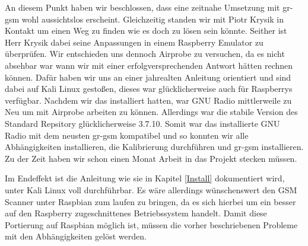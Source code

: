 An diesem Punkt haben wir beschlossen, dass eine zeitnahe Umsetzung mit gr-gsm wohl aussichtslos erscheint. Gleichzeitig standen wir mit Piotr Krysik in Kontakt um einen Weg zu finden wie es doch zu lösen sein könnte. Seither ist Herr Krysik dabei seine Anpassungen in einem Raspberry Emulator zu überprüfen. Wir entschieden uns dennoch Airprobe zu versuchen, da es nicht absehbar war wann wir mit einer erfolgversprechenden Antwort hätten rechnen können. Dafür haben wir uns an einer jahrealten Anleitung orientiert und sind dabei auf Kali Linux gestoßen, dieses war glücklicherweise auch für Raspberrys verfügbar. Nachdem wir das installiert hatten, war GNU Radio mittlerweile zu Neu um mit Airprobe arbeiten zu können. Allerdings war die stabile Version des Standard Repsitory glücklicherweise 3.7.10. Somit war das installierte GNU Radio mit dem neusten gr-gsm kompatibel und so konnten wir alle Abhängigkeiten installieren, die Kalibrierung durchführen und gr-gsm installieren. Zu der Zeit haben wir schon einen Monat Arbeit in das Projekt stecken müssen.

Im Endeffekt ist die Anleitung wie sie in Kapitel \ref{Install} dokumentiert wird, unter Kali Linux voll durchführbar. Es wäre allerdings wünschenswert den GSM Scanner unter Raspbian zum laufen zu bringen, da es sich hierbei um ein besser auf den Raspberry zugeschnittenes Betriebssystem handelt. 
Damit diese Portierung auf Raspbian möglich ist, müssen die vorher beschriebenen Probleme mit den Abhängigkeiten gelöst werden. 
